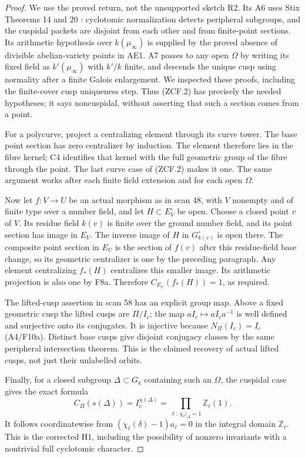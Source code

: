 \begin{proof}
We use the proved return, not the unsupported sketch R2. Its A6
uses Stix Theorems 14 and 20 \cite{CF_Stix2008}: cyclotomic
normalization detects peripheral subgroups, and the cuspidal packets
are disjoint from each other and from finite-point sections. Its
arithmetic hypothesis over $k(\mu_\infty)$ is supplied by the
proved absence of divisible abelian-variety points in AE1. A7
passes to any open $\Omega$ by writing its fixed field as
$k'(\mu_\infty)$ with $k'/k$ finite, and descends the unique cusp
using normality after a finite Galois enlargement. We inspected
these proofs, including the finite-cover cusp uniqueness step.
Thus (ZCF.2) has precisely the needed hypotheses; it says
noncuspidal, without asserting that such a section comes from a point.

For a polycurve, project a centralizing element through its curve
tower. The base point section has zero centralizer by induction.
The element therefore lies in the fibre kernel; C4 identifies that
kernel with the full geometric group of the fibre through the point.
The last curve case of (ZCF.2) makes it one. The same argument works
after each finite field extension and for each open $\Omega$.

Now let $f:V\to U$ be an actual morphism as in scan 48, with $V$
nonempty and of finite type over a number field, and let
$H\subset E_V^\circ$ be open. Choose a closed point $v$ of $V$.
Its residue field $k(v)$ is finite over the ground number field,
and its point section has image in $E_V$. The inverse image of
$H$ in $G_{k(v)}^\circ$ is open there. The composite point section
in $E_U$ is the section of $f(v)$ after this residue-field base
change, so its geometric centralizer is one by the preceding
paragraph. Any element centralizing $f_*(H)$ centralizes this
smaller image. Its arithmetic projection is also one by F8a.
Therefore $C_{E_U}(f_*(H))=1$, as required.

The lifted-cusp assertion in scan 58 has an explicit group map.
Above a fixed geometric cusp the lifted cusps are $\Pi/I_c$;
the map $aI_c\mapsto aI_ca^{-1}$ is well defined and surjective
onto its conjugates. It is injective because $N_\Pi(I_c)=I_c$
(A4/F10a). Distinct base cusps give disjoint conjugacy classes by
the same peripheral intersection theorem. This is the claimed
recovery of actual lifted cusps, not just their unlabelled orbits.

Finally, for a closed subgroup $\Delta\subset G_k$ containing such
an $\Omega$, the cuspidal case gives the exact formula
\[
 C_\Pi(s(\Delta))=I_c^{\chi(\Delta)}
 =\prod_{\ell:\,\chi_\ell|_\Delta=1}\mathbb Z_\ell(1).
\]
It follows coordinatewise from
$(\chi_\ell(\delta)-1)a_\ell=0$ in the integral domain
$\mathbb Z_\ell$. This is the corrected H1, including the possibility
of nonzero invariants with a nontrivial full cyclotomic character.
\end{proof}


